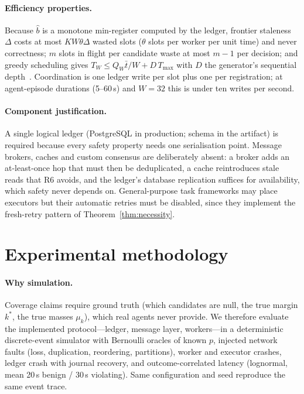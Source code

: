 \documentclass[11pt]{article}
\theoremstyle{definition}
\theoremstyle{remark}
\newcommand{\bhat}{\hat b}
\begin{document}
\paragraph{Efficiency properties.} Because $\bhat$ is a monotone min-register computed by the ledger, frontier staleness $\Delta$ costs at most $KW\theta\Delta$ wasted slots ($\theta$ slots per worker per unit time) and never correctness; $m$ slots in flight per candidate waste at most $m-1$ per decision; and greedy scheduling gives $T_W\le Q_W\bar t/W+D\,T_{\max}$ with $D$ the generator's sequential depth~\cite{graham1969}. Coordination is one ledger write per slot plus one per registration; at agent-episode durations (5--60\,s) and $W=32$ this is under ten writes per second.

\paragraph{Component justification.} A single logical ledger (PostgreSQL in production; schema in the artifact) is required because every safety property needs one serialisation point. Message brokers, caches and custom consensus are deliberately absent: a broker adds an at-least-once hop that must then be deduplicated, a cache reintroduces stale reads that R6 avoids, and the ledger's database replication suffices for availability, which safety never depends on. General-purpose task frameworks may place executors but their automatic retries must be disabled, since they implement the fresh-retry pattern of Theorem~\ref{thm:necessity}.

\section{Experimental methodology}\label{sec:method}

\paragraph{Why simulation.} Coverage claims require ground truth (which candidates are null, the true margin $k^*$, the true masses $\mu_k$), which real agents never provide. We therefore evaluate the implemented protocol---ledger, message layer, workers---in a deterministic discrete-event simulator with Bernoulli oracles of known $p$, injected network faults (loss, duplication, reordering, partitions), worker and executor crashes, ledger crash with journal recovery, and outcome-correlated latency (lognormal, mean 20\,s benign / 30\,s violating). Same configuration and seed reproduce the same event trace.
\end{document}
